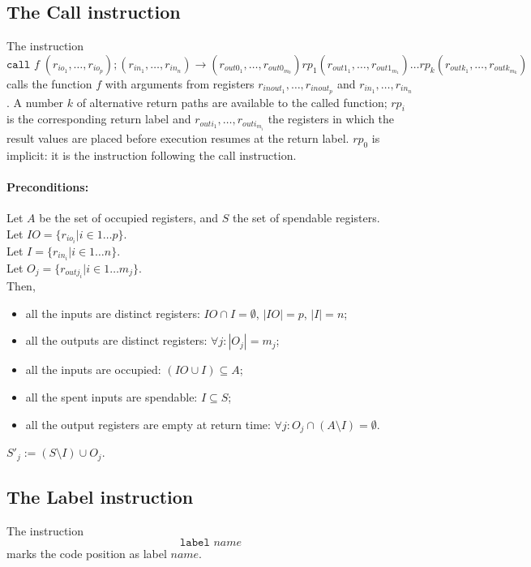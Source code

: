 \documentclass[a4paper]{report}
\begin{document}
\subsection{The Call instruction}
The instruction
$$
\texttt{call } f\; (r_{io_1}, \ldots, r_{io_p});(r_{in_1}, \ldots, r_{in_n})
\rightarrow(r_{{out0}_1}, \ldots, r_{{out0}_{m_0}})
rp_1 (r_{{out1}_1}, \ldots, r_{{out1}_{m_1}})
\ldots
rp_k (r_{{outk}_1}, \ldots, r_{{outk}_{m_k}})
$$
calls the function $f$ with arguments from registers $r_{inout_1}, \ldots, r_{inout_p}$ and $r_{in_1}, \ldots, r_{in_n}$.
A number $k$ of alternative return paths are available to the called function;
$rp_i$ is the corresponding return label and
$r_{{outi}_1}, \ldots, r_{{outi}_{m_i}}$ the registers in which the
result values are placed before execution resumes at the return label.
$rp_0$ is implicit: it is the instruction following the call instruction.

\paragraph{Preconditions:}
Let $A$ be the set of occupied registers, and $S$ the set of
spendable registers.\\
Let $IO = \{r_{io_i} | i \in 1 \ldots p\}$.\\
Let $I = \{r_{in_i} | i \in 1 \ldots n\}$.\\
Let $O_j = \{r_{out j_i} | i \in 1 \ldots m_j\}$.\\

Then,
\begin{itemize}
\item all the inputs are distinct registers: $IO \cap I = \emptyset$, $|IO|=p$, $|I|=n$;
\item all the outputs are distinct registers: $\forall j: |O_j| = m_j$;
\item all the inputs are occupied: $(IO \cup I) \subseteq A$;
\item all the spent inputs are spendable: $I \subseteq S$;
\item all the output registers are empty at return time: $\forall j: O_j \cap (A \setminus I) = \emptyset$.
\end{itemize}

$S'_j := (S \setminus I) \cup O_j$.


\subsection{The Label instruction}
The instruction
$$
\texttt{label }\textit{name}
$$
marks the code position as label $\textit{name}$.
\end{document}
